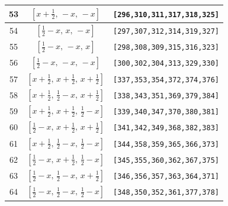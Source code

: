 \documentclass[fleqn,8pt]{jsarticle}
\begin{document}
\begin{longtable}{ccc}
53 & $\left[ x + \frac{1}{2},\, - x,\, - x \right]$ & {\tt [296,310,311,317,318,325]} \\ \hline
54 & $\left[ \frac{1}{2} - x,\, x,\, - x \right]$ & {\tt [297,307,312,314,319,327]} \\ \hline
55 & $\left[ \frac{1}{2} - x,\, - x,\, x \right]$ & {\tt [298,308,309,315,316,323]} \\ \hline
56 & $\left[ \frac{1}{2} - x,\, - x,\, - x \right]$ & {\tt [300,302,304,313,329,330]} \\ \hline
57 & $\left[ x + \frac{1}{2},\, x + \frac{1}{2},\, x + \frac{1}{2} \right]$ & {\tt [337,353,354,372,374,376]} \\ \hline
58 & $\left[ x + \frac{1}{2},\, \frac{1}{2} - x,\, x + \frac{1}{2} \right]$ & {\tt [338,343,351,369,379,384]} \\ \hline
59 & $\left[ x + \frac{1}{2},\, x + \frac{1}{2},\, \frac{1}{2} - x \right]$ & {\tt [339,340,347,370,380,381]} \\ \hline
60 & $\left[ \frac{1}{2} - x,\, x + \frac{1}{2},\, x + \frac{1}{2} \right]$ & {\tt [341,342,349,368,382,383]} \\ \hline
61 & $\left[ x + \frac{1}{2},\, \frac{1}{2} - x,\, \frac{1}{2} - x \right]$ & {\tt [344,358,359,365,366,373]} \\ \hline
62 & $\left[ \frac{1}{2} - x,\, x + \frac{1}{2},\, \frac{1}{2} - x \right]$ & {\tt [345,355,360,362,367,375]} \\ \hline
63 & $\left[ \frac{1}{2} - x,\, \frac{1}{2} - x,\, x + \frac{1}{2} \right]$ & {\tt [346,356,357,363,364,371]} \\ \hline
64 & $\left[ \frac{1}{2} - x,\, \frac{1}{2} - x,\, \frac{1}{2} - x \right]$ & {\tt [348,350,352,361,377,378]} \\
\end{longtable}
\renewcommand{\arraystretch}{1.2}
\end{document}

